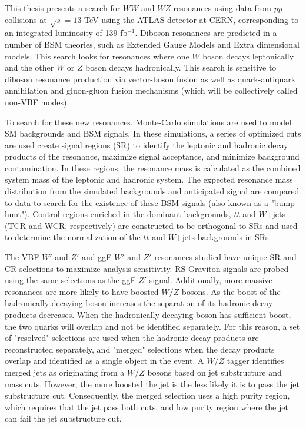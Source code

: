 This thesis presents a search for $WW$ and $WZ$ resonances using data from $pp$ collisions at $\sqrt{s}=13$ TeV using the ATLAS detector at CERN, corresponding to an integrated luminosity of 139 fb$^{-1}$. Diboson resonances are predicted in a number of BSM theories, such as Extended Gauge Models and Extra dimensional models. This search looks for resonances where one $W$ boson decays leptonically and the other $W$ or $Z$ boson decays hadronically. This search is sensitive to diboson resonance production via vector-boson fusion as well as quark-antiquark annihilation and gluon-gluon fusion mechanisms (which will be collectively called non-VBF modes).

To search for these new resonances, Monte-Carlo simulations are used to model SM backgrounds and BSM signals. In these simulations, a series of optimized cuts are used create signal regions (SR) to identify the leptonic and hadronic decay products of the resonance, maximize signal acceptance, and minimize background contamination. In these regions, the resonance mass is calculated as the combined system mass of the leptonic and hadronic system. The expected resonance mass distribution from the simulated backgrounds and anticipated signal are compared to data to search for the existence of these BSM signals (also known as a "bump hunt"). Control regions enriched in the dominant backgrounds, $t\bar{t}$ and $W$+jets (TCR and WCR, respectively) are constructed to be orthogonal to SRs and used to determine the normalization of the $t\bar{t}$ and $W$+jets backgrounds in SRs.

The VBF $W'$ and $Z'$ and ggF $W'$ and $Z'$ resonances studied have unique SR and CR selections to maximize analysis sensitivity. RS Graviton signals are probed using the same selections as the ggF $Z'$ signal. Additionally, more massive resonances are more likely to have boosted $W/Z$ bosons. As the boost of the hadronically decaying boson increases the separation of its hadronic decay products decreases. When the hadronically decaying boson has sufficient boost, the two quarks will overlap and not be identified separately. For this reason, a set of "resolved" selections are used when the hadronic decay products are reconstructed separately, and "merged" selections when the decay products overlap and identified as a single object in the event. A $W/Z$ tagger identifies merged jets as originating from a $W/Z$ bosons based on jet substructure and mass cuts. However, the more boosted the jet is the less likely it is to pass the jet substructure cut. Consequently, the merged selection uses a high purity region, which requires that the jet pass both cuts, and low purity region where the jet can fail the jet substructure cut. 

